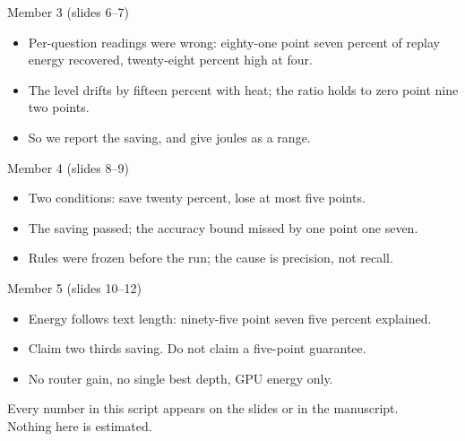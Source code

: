 \documentclass[11pt,a4paper]{article}
\begin{document}
\begin{card}{Member 3 \textnormal{\small (slides 6--7)}}
\begin{itemize}[leftmargin=1.2em,itemsep=3pt,topsep=1pt]
  \item Per-question readings were wrong: eighty-one point seven percent of replay energy recovered, twenty-eight percent high at four.
  \item The level drifts by fifteen percent with heat; the ratio holds to zero point nine two points.
  \item So we report the saving, and give joules as a range.
\end{itemize}
\end{card}

\begin{card}{Member 4 \textnormal{\small (slides 8--9)}}
\begin{itemize}[leftmargin=1.2em,itemsep=3pt,topsep=1pt]
  \item Two conditions: save twenty percent, lose at most five points.
  \item The saving passed; the accuracy bound missed by one point one seven.
  \item Rules were frozen before the run; the cause is precision, not recall.
\end{itemize}
\end{card}

\begin{card}{Member 5 \textnormal{\small (slides 10--12)}}
\begin{itemize}[leftmargin=1.2em,itemsep=3pt,topsep=1pt]
  \item Energy follows text length: ninety-five point seven five percent explained.
  \item Claim two thirds saving. Do not claim a five-point guarantee.
  \item No router gain, no single best depth, GPU energy only.
\end{itemize}
\end{card}

\vspace{10pt}
\begin{center}
\small\color{muted} Every number in this script appears on the slides or in the manuscript.\\
Nothing here is estimated.
\end{center}
\end{document}
